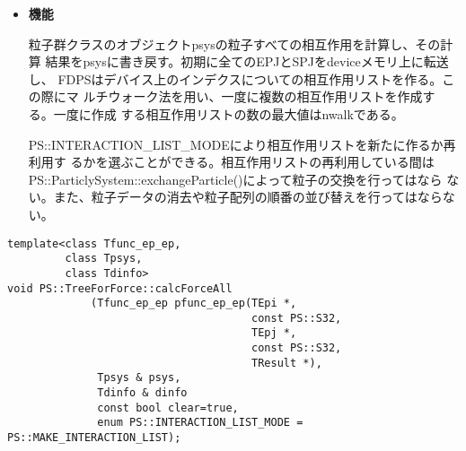 \begin{itemize}
\item {\bf 機能}

粒子群クラスのオブジェクトpsysの粒子すべての相互作用を計算し、その計算
結果をpsysに書き戻す。初期に全てのEPJとSPJをdeviceメモリ上に転送し、
FDPSはデバイス上のインデクスについての相互作用リストを作る。この際にマ
ルチウォーク法を用い、一度に複数の相互作用リストを作成する。一度に作成
する相互作用リストの数の最大値はnwalkである。

PS::INTERACTION\_LIST\_MODEにより相互作用リストを新たに作るか再利用す
るかを選ぶことができる。相互作用リストの再利用している間は
PS::ParticlySystem::exchangeParticle()によって粒子の交換を行ってはなら
ない。また、粒子データの消去や粒子配列の順番の並び替えを行ってはならな
い。

\end{itemize}



\begin{screen}
\begin{verbatim}
template<class Tfunc_ep_ep,
         class Tpsys,
         class Tdinfo>
void PS::TreeForForce::calcForceAll
             (Tfunc_ep_ep pfunc_ep_ep(TEpi *,
                                      const PS::S32,
                                      TEpj *,
                                      const PS::S32,
                                      TResult *),
              Tpsys & psys,
              Tdinfo & dinfo
              const bool clear=true,
              enum PS::INTERACTION_LIST_MODE = PS::MAKE_INTERACTION_LIST);
\end{verbatim}
\end{screen}

